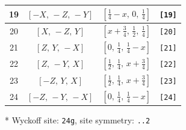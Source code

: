 \documentclass[fleqn,8pt]{jsarticle}
\begin{document}
\begin{longtable}{cccc}
19 & $\left[ - X,\, - Z,\, - Y \right]$ & $\left[ \frac{1}{4} - x,\, 0,\, \frac{1}{4} \right]$ & {\tt [19]} \\ \hline
20 & $\left[ X,\, - Z,\, Y \right]$ & $\left[ x + \frac{3}{4},\, \frac{1}{2},\, \frac{1}{4} \right]$ & {\tt [20]} \\ \hline
21 & $\left[ Z,\, Y,\, - X \right]$ & $\left[ 0,\, \frac{1}{4},\, \frac{1}{4} - x \right]$ & {\tt [21]} \\ \hline
22 & $\left[ Z,\, - Y,\, X \right]$ & $\left[ \frac{1}{2},\, \frac{1}{4},\, x + \frac{3}{4} \right]$ & {\tt [22]} \\ \hline
23 & $\left[ - Z,\, Y,\, X \right]$ & $\left[ \frac{1}{2},\, \frac{1}{4},\, x + \frac{3}{4} \right]$ & {\tt [23]} \\ \hline
24 & $\left[ - Z,\, - Y,\, - X \right]$ & $\left[ 0,\, \frac{1}{4},\, \frac{1}{4} - x \right]$ & {\tt [24]} \\
\end{longtable}
* Wyckoff site: {\tt 24g}, site symmetry: {\tt ..2}
\renewcommand{\arraystretch}{1.2}
\end{document}
